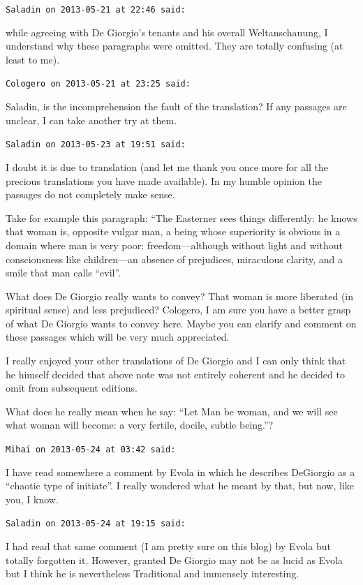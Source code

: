 \begin{footnotesize}\begin{sffamily}



\texttt{Saladin on 2013-05-21 at 22:46 said: }

while agreeing with De Giorgio's tenants and his overall Weltanschauung, I understand why these paragraphs were omitted. They are totally confusing (at least to me).


\hfill

\texttt{Cologero on 2013-05-21 at 23:25 said: }

Saladin, is the incomprehension the fault of the translation? If any passages are unclear, I can take another try at them.


\hfill

\texttt{Saladin on 2013-05-23 at 19:51 said: }

I doubt it is due to translation (and let me thank you once more for all the precious translations you have made available). In my humble opinion the passages do not completely make sense.

Take for example this paragraph: “The Easterner sees things differently: he knows that woman is, opposite vulgar man, a being whose superiority is obvious in a domain where man is very poor: freedom—although without light and without consciousness like children—an absence of prejudices, miraculous clarity, and a smile that man calls “evil”.

What does De Giorgio really wants to convey? That woman is more liberated (in spiritual sense) and less prejudiced? Cologero, I am sure you have a better grasp of what De Giorgio wants to convey here. Maybe you can clarify and comment on these passages which will be very much appreciated.

I really enjoyed your other translations of De Giorgio and I can only think that he himself decided that above note was not entirely coherent and he decided to omit from subsequent editions.

What does he really mean when he say: “Let Man be woman, and we will see what woman will become: a very fertile, docile, subtle being.”?


\hfill

\texttt{Mihai on 2013-05-24 at 03:42 said: }

I have read somewhere a comment by Evola in which he describes DeGiorgio as a “chaotic type of initiate”. I really wondered what he meant by that, but now, like you, I know.

\hfill

\texttt{Saladin on 2013-05-24 at 19:15 said: }

I had read that same comment (I am pretty sure on this blog) by Evola but totally forgotten it. However, granted De Giorgio may not be as lucid as Evola but I think he is nevertheless Traditional and immensely interesting.


\end{sffamily}\end{footnotesize}
